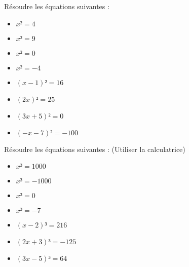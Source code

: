 \documentclass{beamer}
\begin{document}
\begin{frame}
	Résoudre les équations suivantes :
	\begin{multicols}{2}
		\begin{itemize}
			\item $x² = 4$
			\item $x² = 9$
			\item<2-> $x² = 0$
			\item<3-> $x² = -4$
			\item<4-> $(x - 1)² = 16$
			\item<5-> $(2x)² = 25$
			\item<5-> $(3x + 5)² = 0$
			\item<5-> $(-x - 7)² = -100$
		\end{itemize}
	\end{multicols}
\end{frame}

\begin{frame}
	Résoudre les équations suivantes : \onslide<2-> { (Utiliser la calculatrice) }
	\begin{multicols}{2}
		\begin{itemize}
			\item $x³ = 1000$
			\item $x³ = -1000$
			\item<2-> $x³ = 0$
			\item<2-> $x³ = -7$
			\item<2-> $(x - 2)³ = 216$
			\item<2-> $(2x + 3)³ = -125$
			\item<2-> $(3x - 5)³ = 64$
		\end{itemize}
	\end{multicols}
\end{frame}
\end{document}
